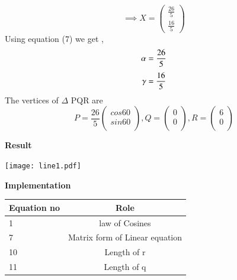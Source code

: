 \documentclass[10pt,a4paper]{article}
\begin{document}
\begin{multicols}{2}
{  \begin{equation}
\implies X = 
   \begin{pmatrix}
   \frac {26}{5}\\ 
   \frac{16}{5}
 \end{pmatrix}
 \end{equation}
Using equation (7) we get ,
\begin{equation}
	\alpha = \frac{26}{5} \vspace{2mm}
\end{equation}
\begin{equation}
	\gamma= \frac{16}{5}\vspace{2mm}
\end{equation}
The vertices of $\Delta$ PQR are \\
\begin{equation}
P= \frac{26}{5} \begin{pmatrix}
cos 60\\
sin 60\\
\end{pmatrix} 
,Q= \begin{pmatrix}
 0\\
 0\\
 \end{pmatrix} 
,R= \begin{pmatrix}
 6\\
 0\\
\end{pmatrix} 
\end{equation} \vspace{2mm}


\textbf{Result} 
\begin{center}
	\texttt{[image: line1.pdf]}
\end{center}\vspace{5mm}

\vspace{4mm}  
\textbf{Implementation}
\begin{center}
\setlength{\arrayrulewidth}{0.5mm}
\setlength{\tabcolsep}{5pt}
\renewcommand{\arraystretch}{3}
    \begin{tabular}{|l|c|}
    \hline 
    \textbf{Equation no} & \textbf{Role} \\ \hline
    1 &  law of Cosines \\ 
    7 & Matrix form of Linear equation  \\
    10 & Length of r\\
    11& Length of q \\
    

\end{tabular}
\end{center}}
\end{multicols}
\end{document}
